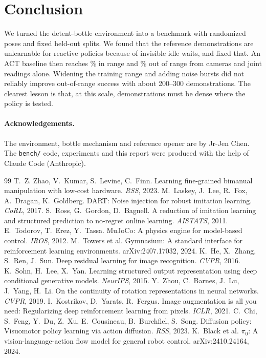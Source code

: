 \documentclass[10pt,twocolumn,letterpaper]{article}
\newcommand{\ttt}[1]{\texttt{\small #1}}
\begin{document}
\section{Conclusion}
We turned the detent-bottle environment into a benchmark with randomized poses and fixed held-out splits. We
found that the reference demonstrations are unlearnable for reactive policies because of invisible idle waits,
and fixed that. An ACT baseline then reaches \VtwoId\% in range and \VtwoOod\% out of range from cameras and
joint readings alone. Widening the training range and adding noise bursts did not reliably improve
out-of-range success with about 200--300 demonstrations. The clearest lesson is that, at this scale,
demonstrations must be dense where the policy is tested.

\paragraph{Acknowledgements.} The environment, bottle mechanism and reference opener are by Jr-Jen Chen. The
\ttt{bench/} code, experiments and this report were produced with the help of Claude Code (Anthropic).

\small\raggedright
\begin{thebibliography}{99}\itemsep0pt
 T.~Z. Zhao, V.~Kumar, S.~Levine, C.~Finn. Learning fine-grained bimanual manipulation with low-cost hardware. \emph{RSS}, 2023.
 M.~Laskey, J.~Lee, R.~Fox, A.~Dragan, K.~Goldberg. DART: Noise injection for robust imitation learning. \emph{CoRL}, 2017.
 S.~Ross, G.~Gordon, D.~Bagnell. A reduction of imitation learning and structured prediction to no-regret online learning. \emph{AISTATS}, 2011.
 E.~Todorov, T.~Erez, Y.~Tassa. MuJoCo: A physics engine for model-based control. \emph{IROS}, 2012.
 M.~Towers et al. Gymnasium: A standard interface for reinforcement learning environments. arXiv:2407.17032, 2024.
 K.~He, X.~Zhang, S.~Ren, J.~Sun. Deep residual learning for image recognition. \emph{CVPR}, 2016.
 K.~Sohn, H.~Lee, X.~Yan. Learning structured output representation using deep conditional generative models. \emph{NeurIPS}, 2015.
 Y.~Zhou, C.~Barnes, J.~Lu, J.~Yang, H.~Li. On the continuity of rotation representations in neural networks. \emph{CVPR}, 2019.
 I.~Kostrikov, D.~Yarats, R.~Fergus. Image augmentation is all you need: Regularizing deep reinforcement learning from pixels. \emph{ICLR}, 2021.
 C.~Chi, S.~Feng, Y.~Du, Z.~Xu, E.~Cousineau, B.~Burchfiel, S.~Song. Diffusion policy: Visuomotor policy learning via action diffusion. \emph{RSS}, 2023.
 K.~Black et al. $\pi_0$: A vision-language-action flow model for general robot control. arXiv:2410.24164, 2024.
\end{thebibliography}
\end{document}
